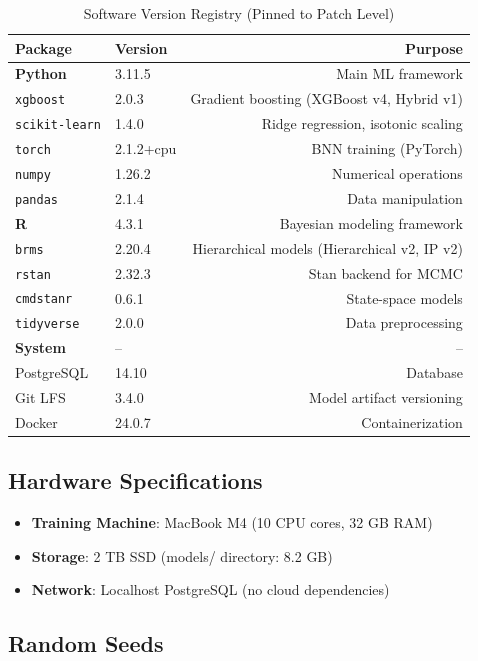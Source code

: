 \begin{table}[h]
\centering
\caption{Software Version Registry (Pinned to Patch Level)}
\label{tab:software-versions}
\begin{tabular}{llr}
\toprule
\textbf{Package} & \textbf{Version} & \textbf{Purpose} \\
\midrule
\textbf{Python} & 3.11.5 & Main ML framework \\
\texttt{xgboost} & 2.0.3 & Gradient boosting (XGBoost v4, Hybrid v1) \\
\texttt{scikit-learn} & 1.4.0 & Ridge regression, isotonic scaling \\
\texttt{torch} & 2.1.2+cpu & BNN training (PyTorch) \\
\texttt{numpy} & 1.26.2 & Numerical operations \\
\texttt{pandas} & 2.1.4 & Data manipulation \\
\midrule
\textbf{R} & 4.3.1 & Bayesian modeling framework \\
\texttt{brms} & 2.20.4 & Hierarchical models (Hierarchical v2, IP v2) \\
\texttt{rstan} & 2.32.3 & Stan backend for MCMC \\
\texttt{cmdstanr} & 0.6.1 & State-space models \\
\texttt{tidyverse} & 2.0.0 & Data preprocessing \\
\midrule
\textbf{System} & -- & -- \\
PostgreSQL & 14.10 & Database \\
Git LFS & 3.4.0 & Model artifact versioning \\
Docker & 24.0.7 & Containerization \\
\bottomrule
\end{tabular}
\end{table}

\subsection{Hardware Specifications}

\begin{itemize}
\item \textbf{Training Machine}: MacBook M4 (10 CPU cores, 32 GB RAM)
\item \textbf{Storage}: 2 TB SSD (models/ directory: 8.2 GB)
\item \textbf{Network}: Localhost PostgreSQL (no cloud dependencies)
\end{itemize}

\subsection{Random Seeds}

